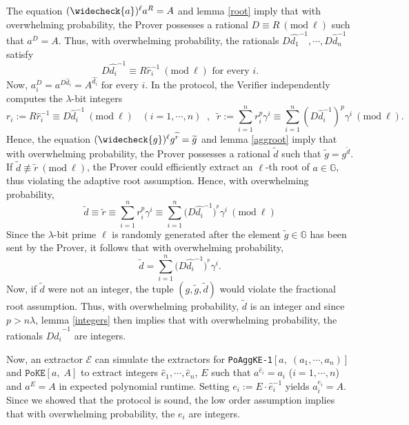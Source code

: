 \documentclass[11pt, lettersize, notitlepage, leqno, footskip=0.6cm]{article}
\newcommand{\slim}{\sum\limits}
\newcommand{\ttt}{\texttt}
\newcommand{\bG}{\mathbb{G}}
\newcommand{\wti}{\widetilde}
\newcommand{\mc}{\mathcal}
\newcommand{\lam}{\lambda}
\newcommand{\what}{\widehat}
\newcommand{\weck}{\widecheck}
\newcommand{\vs}{\vspace{-0.15cm}}
\newcommand{\op}{overwhelming probability}
\newcommand{\Mod}[1]{\ (\mathrm{mod}\ #1)}
\newcommand{\E}{\mc{E}}
\numberwithin{equation}{section}
\begin{document}
\begin{prf}
The equation $(\weck{a})^{\ell}a^R= A$ and lemma \ref{root} imply that with \op, the Prover possesses a rational $D\equiv R\Mod{\ell}$ such that $a^D = A$. Thus, with \op, the rationals $D\what{d_1}^{-1},\cdots,D\what{d}_n^{-1}$ satisfy \vs $$D\what{d_i}^{-1}\equiv R\what{r}_i^{-1}\Mod{\ell} \text{ for every }i.$$ Now, $a_i^{D} = a^{D\what{d}_i} = A^{\what{d_i}} \text{ for every }i.$ In the protocol, the Verifier independently computes the $\lam$-bit integers \vs $$r_i:= R\what{r}_{i}^{-1}\equiv D\what{d}_i^{-1}\Mod{\ell}\;\;\;(i=1,\cdots,n)\;\;,\;\;\wti{r}:= {\slim_{i=1}^n r_i^{p}\gamma^i}\equiv {\slim_{i=1}^n (D\what{d}_i^{-1})^{p}\gamma^i}\Mod{\ell}.$$ Hence, the equation $(\weck{g})^{\ell}g^{\wti{r}} = \wti{g}$ and lemma \ref{aggroot} imply that with \op, the Prover possesses a rational $\wti{d}$ such that $\wti{g} = g^{\wti{d}}$. If $\wti{d}\not\equiv\wti{r}\Mod{\ell}$, the Prover could efficiently extract an $\ell$-th root of $a\in\bG$, thus violating the adaptive root assumption. Hence, with \op, \vs $$\wti{d}\equiv \wti{r}\equiv \slim_{i=1}^n r_i^{{p}}\gamma^i \equiv   \slim_{i=1}^n \big(D\what{d_i}^{-1}\big)^{^{p}}\gamma^i \Mod{\ell}$$ Since the $\lam$-bit prime $\ell$ is randomly generated after the element $\wti{g}\in\bG$ has been sent by the Prover, it follows that with \op, \vs $$\wti{d} = \slim_{i=1}^n \big(D\what{d_i}^{-1}\big)^{^{p}}\gamma^i. $$ Now, if $\wti{d}$ were not an integer, the tuple $(g, \wti{g}, \wti{d})$ would violate the fractional root assumption. Thus, with \op, $\wti{d}$ is an integer and since $p > n\lam$, lemma \ref{integers} then implies that with \op, the rationals $D\what{d_i}^{-1}$ are integers.

Now, an extractor $\E$ can simulate the extractors for \verb|PoAggKE-1|$[a,\;(a_1,\cdots,a_n)]$ and $\ttt{PoKE}[a,\; A]$ to extract integers $\what{e}_1,\cdots, \what{e}_n$, $E$ such that $a^{\what{e}_i} = a_i$ ($i=1,\cdots,n$) and $a^E = A$ in expected polynomial runtime. Setting $e_i:= E\cdot\what{e}_i^{-1}$ yields $a_i^{e_i} = A$. Since we showed that the protocol is sound, the low order assumption implies that with \op, the $e_i$ are integers.\end{prf}

\end{document}
